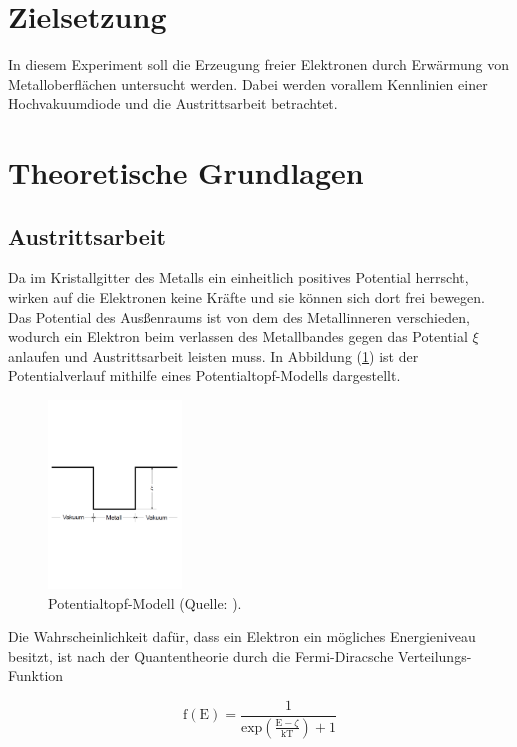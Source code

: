 \section{Zielsetzung}
In diesem Experiment soll die Erzeugung freier Elektronen durch Erwärmung von Metalloberflächen untersucht werden.
Dabei werden vorallem Kennlinien einer Hochvakuumdiode und die Austrittsarbeit betrachtet.

\section{Theoretische Grundlagen}
\subsection{Austrittsarbeit}

\noindent
Da im Kristallgitter des Metalls ein einheitlich positives Potential herrscht, 
wirken auf die Elektronen keine Kräfte und sie können sich dort frei bewegen.
Das Potential des Ausßenraums ist von dem des Metallinneren verschieden, 
wodurch ein Elektron beim verlassen des Metallbandes gegen das Potential $\xi$ anlaufen und Austrittsarbeit leisten muss.
In Abbildung (\ref{fig:pottopf}) ist der Potentialverlauf mithilfe eines Potentialtopf-Modells dargestellt.

\begin{figure}
    \centering
       \includegraphics[height=5cm]{pottopf.pdf}
       \caption{Potentialtopf-Modell (Quelle: \cite{V504}).}
       \label{fig:pottopf}
\end{figure}

\noindent
Die Wahrscheinlichkeit dafür, dass ein Elektron ein mögliches Energieniveau besitzt, 
ist nach der Quantentheorie durch die Fermi-Diracsche Verteilungs-Funktion 

\begin{equation}
\text{f}(\text{E})=\frac{1}{\text{exp}(\frac{\text{E}-\zeta}{\text{kT}}) + 1}
\label{eqn:fermi}
\end{equation}

